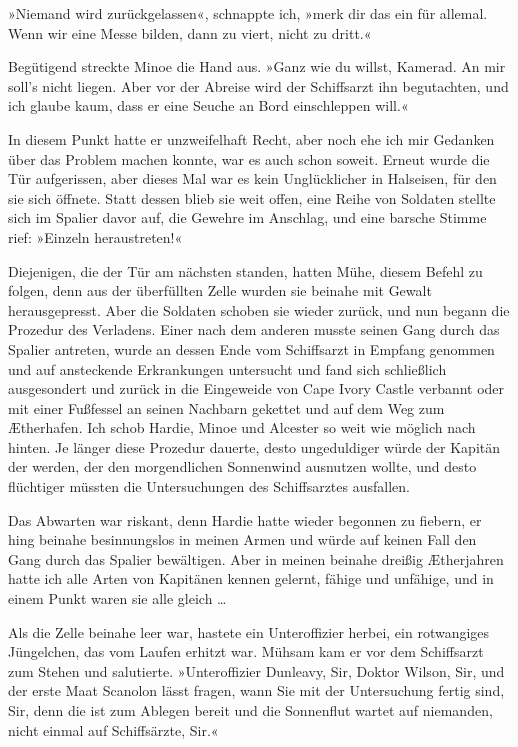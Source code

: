 »Niemand wird zurückgelassen«, schnappte ich, »merk dir das ein für
allemal. Wenn wir eine Messe bilden, dann zu viert, nicht zu
dritt.«

Begütigend streckte Minoe die Hand aus. »Ganz wie du willst,
Kamerad. An mir soll’s nicht liegen. Aber vor der Abreise wird der
Schiffsarzt ihn begutachten, und ich glaube kaum, dass er eine
Seuche an Bord einschleppen will.«

In diesem Punkt hatte er unzweifelhaft Recht, aber noch ehe ich mir
Gedanken über das Problem machen konnte, war es auch schon soweit.
Erneut wurde die Tür aufgerissen, aber dieses Mal war es kein
Unglücklicher in Halseisen, für den sie sich öffnete. Statt dessen
blieb sie weit offen, eine Reihe von Soldaten stellte sich im
Spalier davor auf, die Gewehre im Anschlag, und eine barsche Stimme
rief: »Einzeln heraustreten!«

Diejenigen, die der Tür am nächsten standen, hatten Mühe, diesem
Befehl zu folgen, denn aus der überfüllten Zelle wurden sie beinahe
mit Gewalt herausgepresst. Aber die Soldaten schoben sie wieder
zurück, und nun begann die Prozedur des Verladens. Einer nach dem
anderen musste seinen Gang durch das Spalier antreten, wurde an
dessen Ende vom Schiffsarzt in Empfang genommen und auf ansteckende
Erkrankungen untersucht und fand sich schließlich ausgesondert und
zurück in die Eingeweide von Cape Ivory Castle verbannt oder mit
einer Fußfessel an seinen Nachbarn gekettet und auf dem Weg zum
Ætherhafen. Ich schob Hardie, Minoe und Alcester so weit wie
möglich nach hinten. Je länger diese Prozedur dauerte, desto
ungeduldiger würde der Kapitän der  werden, der den
morgendlichen Sonnenwind ausnutzen wollte, und desto flüchtiger
müssten die Untersuchungen des Schiffsarztes ausfallen.

Das Abwarten war riskant, denn Hardie hatte wieder begonnen zu
fiebern, er hing beinahe besinnungslos in meinen Armen und würde
auf keinen Fall den Gang durch das Spalier bewältigen. Aber in
meinen beinahe dreißig Ætherjahren hatte ich alle Arten von
Kapitänen kennen gelernt, fähige und unfähige, und in einem Punkt
waren sie alle gleich \ldots{}

\bigpar

Als die Zelle beinahe leer war, hastete ein Unteroffizier herbei,
ein rotwangiges Jüngelchen, das vom Laufen erhitzt war. Mühsam kam
er vor dem Schiffsarzt zum Stehen und salutierte. »Unteroffizier
Dunleavy, Sir, Doktor Wilson, Sir, und der erste Maat Scanolon
lässt fragen, wann Sie mit der Untersuchung fertig sind, Sir, denn
die  ist zum Ablegen bereit und die Sonnenflut
wartet auf niemanden, nicht einmal auf Schiffsärzte, Sir.«

